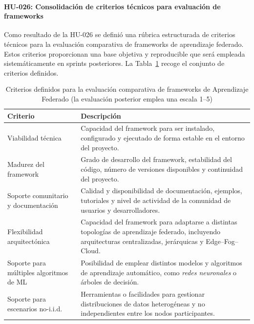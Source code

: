 \documentclass{report}
\begin{document}
\paragraph{HU-026: Consolidación de criterios técnicos para evaluación de frameworks}
Como resultado de la HU-026 se definió una rúbrica estructurada de criterios técnicos para la evaluación comparativa de frameworks de aprendizaje federado. Estos criterios proporcionan una base objetiva y reproducible que será empleada sistemáticamente en sprints posteriores. La Tabla~\ref{tab:criterios-frameworks} recoge el conjunto de criterios definidos.

\begin{table}[H]
\centering
\footnotesize
\caption{Criterios definidos para la evaluación comparativa de frameworks de Aprendizaje Federado (la evaluación posterior emplea una escala 1--5)}
\label{tab:criterios-frameworks}

\renewcommand{\arraystretch}{1.15}
\setlength{\tabcolsep}{4pt}

\begin{tabularx}{\linewidth}{@{}p{3.6cm} >{\RaggedRight\arraybackslash}X @{}}
\toprule
\textbf{Criterio} & \textbf{Descripción} \\
\midrule
Viabilidad técnica
& Capacidad del framework para ser instalado, configurado y ejecutado de forma estable en el entorno del proyecto. \\

Madurez del framework
& Grado de desarrollo del framework, estabilidad del código, número de versiones disponibles y continuidad del proyecto. \\

Soporte comunitario y documentación
& Calidad y disponibilidad de documentación, ejemplos, tutoriales y nivel de actividad de la comunidad de usuarios y desarrolladores. \\

Flexibilidad arquitectónica
& Capacidad del framework para adaptarse a distintas topologías de aprendizaje federado, incluyendo arquitecturas centralizadas, jerárquicas y Edge--Fog--Cloud. \\

Soporte para múltiples algoritmos de ML
& Posibilidad de emplear distintos modelos y algoritmos de aprendizaje automático, como \textit{redes neuronales} o árboles de decisión. \\

Soporte para escenarios no-i.i.d.
& Herramientas o facilidades para gestionar distribuciones de datos heterogéneas y no independientes entre los nodos participantes. \\


\end{tabularx}
\end{table}
\end{document}
